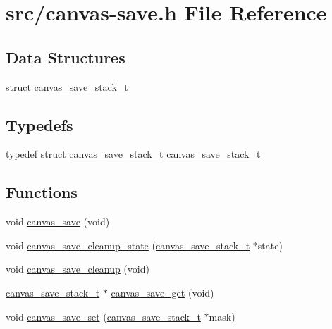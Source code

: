 \hypertarget{canvas-save_8h}{}\section{src/canvas-\/save.h File Reference}
\label{canvas-save_8h}
\subsection*{Data Structures}
\begin{DoxyCompactItemize}
\item 
struct \hyperlink{structcanvas__save__stack__t}{canvas\+\_\+save\+\_\+stack\+\_\+t}
\end{DoxyCompactItemize}
\subsection*{Typedefs}
\begin{DoxyCompactItemize}
\item 
typedef struct \hyperlink{structcanvas__save__stack__t}{canvas\+\_\+save\+\_\+stack\+\_\+t} \hyperlink{canvas-save_8h_ac48d601a20f95c93f677cd13d184ea11}{canvas\+\_\+save\+\_\+stack\+\_\+t}
\end{DoxyCompactItemize}
\subsection*{Functions}
\begin{DoxyCompactItemize}
\item 
void \hyperlink{canvas-save_8h_ae82cc37b7b2b1c9148a08032a0c7cc40}{canvas\+\_\+save} (void)
\item 
void \hyperlink{canvas-save_8h_ad66c58baf950803e925aff072d137d66}{canvas\+\_\+save\+\_\+cleanup\+\_\+state} (\hyperlink{structcanvas__save__stack__t}{canvas\+\_\+save\+\_\+stack\+\_\+t} $\ast$state)
\item 
void \hyperlink{canvas-save_8h_a2e0a1c92b277e1ba569f0c1a6d2eb093}{canvas\+\_\+save\+\_\+cleanup} (void)
\item 
\hyperlink{structcanvas__save__stack__t}{canvas\+\_\+save\+\_\+stack\+\_\+t} $\ast$ \hyperlink{canvas-save_8h_af7ed9425b815c74e76980a76480f31c4}{canvas\+\_\+save\+\_\+get} (void)
\item 
void \hyperlink{canvas-save_8h_a80c6b83cd52721033525e153cde878e7}{canvas\+\_\+save\+\_\+set} (\hyperlink{structcanvas__save__stack__t}{canvas\+\_\+save\+\_\+stack\+\_\+t} $\ast$mask)
\end{DoxyCompactItemize}


